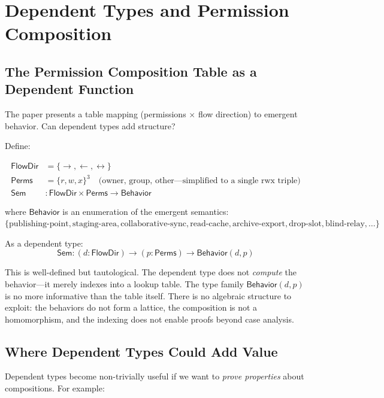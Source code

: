 \documentclass[11pt]{article}
\newcommand{\tp}[1]{\mathsf{#1}}
\newcommand{\Perms}{\mathsf{Perms}}
\newcommand{\FlowDir}{\mathsf{FlowDir}}
\newcommand{\Sem}{\mathsf{Sem}}
\begin{document}
\section{Dependent Types and Permission Composition}\label{sec:dependent}

\subsection{The Permission Composition Table as a Dependent Function}

The paper presents a table mapping (permissions $\times$ flow direction) to
emergent behavior. Can dependent types add structure?

Define:

\begin{align*}
  \FlowDir &= \{\rightarrow, \leftarrow, \leftrightarrow\} \\
  \Perms &= \{r, w, x\}^3 \quad \text{(owner, group, other---simplified to a single rwx triple)} \\
  \Sem &: \FlowDir \times \Perms \to \tp{Behavior}
\end{align*}

where $\tp{Behavior}$ is an enumeration of the emergent semantics:
$\{\text{publishing-point}, \text{staging-area}, \text{collaborative-sync},
  \text{read-cache}, \text{archive-export}, \text{drop-slot},
  \text{blind-relay}, \ldots\}$

As a dependent type:
\[
  \Sem : (d : \FlowDir) \to (p : \Perms) \to \tp{Behavior}(d, p)
\]

This is well-defined but tautological. The dependent type does not \emph{compute}
the behavior---it merely indexes into a lookup table. The type family
$\tp{Behavior}(d, p)$ is no more informative than the table itself. There is
no algebraic structure to exploit: the behaviors do not form a lattice, the
composition is not a homomorphism, and the indexing does not enable proofs
beyond case analysis.

\subsection{Where Dependent Types Could Add Value}

Dependent types become non-trivially useful if we want to \emph{prove
properties} about compositions. For example:
\end{document}
